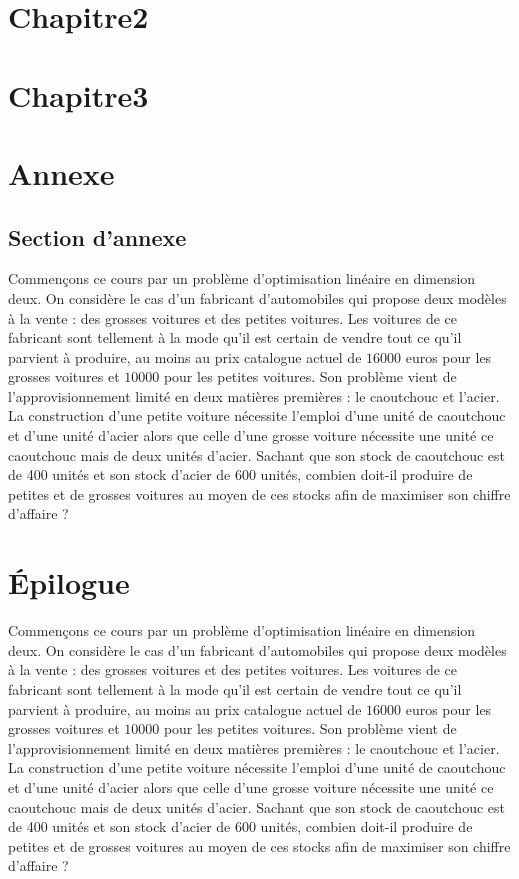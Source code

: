 \documentclass[a4paper, 11pt,openany]{book}%
\newtheorem[L]{thm}{Théorème}[section]
\newtheorem[M]{propo}[thm]{Proposition}
\newtheorem[M]{prop}[thm]{Propriété}
\newtheorem[M]{coro}[thm]{Corollaire}
\newtheorem[M]{lem}[thm]{Lemme}
\newtheorem[M,bodystyle=]{defi}[thm]{Définition}
\newtheorem[M,bodystyle=]{remark}[thm]{Remarque}
\newtheorem[M,bodystyle=]{met}[thm]{Méthode}
\newtheorem[M,bodystyle=]{ret}[thm]{A retenir}
\newtheorem[M,bodystyle=]{idee}[thm]{Idée}
\newtheorem[style=S,underline=false,bodystyle=]{exem}[thm]{Exemple}
\newtheorem[S,underline=false,bodystyle=]{exo}[thm]{Exercice}
\newtheorem[S,underline=false,bodystyle=]{appli}[thm]{Application}
\newtheorem[S,underline=false,bodystyle=]{sol}[thm]{Solution}
\newtheorem[S,underline=false,bodystyle=]{hypo}[thm]{Hypothesis}
\newtheorem[S,underline=false,bodystyle=]{nota}[thm]{Notation}
\begin{document}
               

              \chapter{Chapitre2}

                 \chapter{Chapitre3}    

   \appendix

   \chapter{Annexe}

      \section{Section d'annexe}

    Commençons ce cours par un problème d'optimisation linéaire en dimension deux. On considère le cas d'un fabricant d'automobiles qui propose deux modèles à la vente : des grosses voitures et des petites voitures. Les voitures de ce fabricant sont tellement à la mode qu'il est certain de vendre tout ce qu'il parvient à produire, au moins au prix catalogue actuel de $16000$ euros pour les grosses voitures et $10000$ pour les petites voitures. Son problème vient de l'approvisionnement limité en deux matières premières : le caoutchouc et l'acier. La construction d'une petite voiture nécessite l'emploi d'une unité de caoutchouc et d'une unité d'acier alors que celle d'une grosse voiture nécessite une unité ce caoutchouc mais de deux unités d'acier. Sachant que son stock de caoutchouc est de 400 unités et son stock d'acier de 600 unités, combien doit-il produire de petites et de grosses voitures au moyen de ces stocks afin de maximiser son chiffre d'affaire ?

   \backmatter

   \chapter{Épilogue}

   Commençons ce cours par un problème d'optimisation linéaire en dimension deux. On considère le cas d'un fabricant d'automobiles qui propose deux modèles à la vente : des grosses voitures et des petites voitures. Les voitures de ce fabricant sont tellement à la mode qu'il est certain de vendre tout ce qu'il parvient à produire, au moins au prix catalogue actuel de $16000$ euros pour les grosses voitures et $10000$ pour les petites voitures. Son problème vient de l'approvisionnement limité en deux matières premières : le caoutchouc et l'acier. La construction d'une petite voiture nécessite l'emploi d'une unité de caoutchouc et d'une unité d'acier alors que celle d'une grosse voiture nécessite une unité ce caoutchouc mais de deux unités d'acier. Sachant que son stock de caoutchouc est de 400 unités et son stock d'acier de 600 unités, combien doit-il produire de petites et de grosses voitures au moyen de ces stocks afin de maximiser son chiffre d'affaire ?
\end{document}
